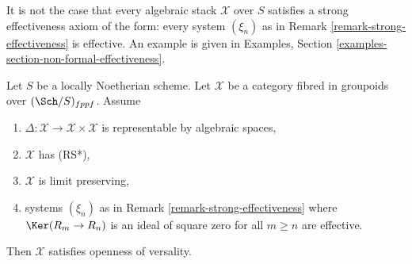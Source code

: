 \noindent
It is not the case that every algebraic stack $\mathcal{X}$
over $S$ satisfies a strong effectiveness axiom of the form:
every system $(\xi_n)$ as in Remark \ref{remark-strong-effectiveness}
is effective. An example is given in
Examples, Section \ref{examples-section-non-formal-effectiveness}.

\begin{lemma}
\label{lemma-SGE-implies-openness-versality}
Let $S$ be a locally Noetherian scheme. Let $\mathcal{X}$ be a category fibred
in groupoids over $(\Sch/S)_{fppf}$. Assume
\begin{enumerate}
\item $\Delta : \mathcal{X} \to \mathcal{X} \times \mathcal{X}$ is
representable by algebraic spaces,
\item $\mathcal{X}$ has (RS*),
\item $\mathcal{X}$ is limit preserving,
\item systems $(\xi_n)$ as in Remark \ref{remark-strong-effectiveness}
where $\Ker(R_m \to R_n)$ is an ideal of square zero for all $m \geq n$
are effective.
\end{enumerate}
Then $\mathcal{X}$ satisfies openness of versality.
\end{lemma}

